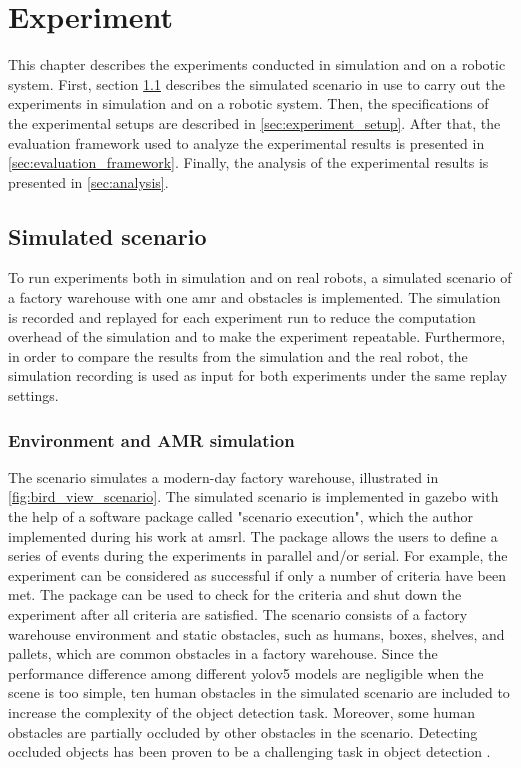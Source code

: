 \chapter{Experiment}\label{ch:experiment}

This chapter describes the experiments conducted in simulation and on a robotic system. First, section \cref{sec:simulated_scenario} describes the simulated scenario in use to carry out the experiments in simulation and on a robotic system. Then, the specifications of the experimental setups are described in \cref{sec:experiment_setup}. After that, the evaluation framework used to analyze the experimental results is presented in \cref{sec:evaluation_framework}. Finally, the analysis of the experimental results is presented in \cref{sec:analysis}.

\section{Simulated scenario}\label{sec:simulated_scenario}

To run experiments both in simulation and on real robots, a simulated scenario of a factory warehouse with one \gls{amr} and obstacles is implemented. The simulation is recorded and replayed for each experiment run to reduce the computation overhead of the simulation and to make the experiment repeatable. Furthermore, in order to compare the results from the simulation and the real robot, the simulation recording is used as input for both experiments under the same replay settings. 

\subsection{Environment and AMR simulation}

The scenario simulates a modern-day factory warehouse, illustrated in \cref{fig:bird_view_scenario}. The simulated scenario is implemented in \gls{gazebo} with the help of a software package called "scenario execution", which the author implemented during his work at \gls{amsrl}. The package allows the users to define a series of events during the experiments in parallel and/or serial. For example, the experiment can be considered as successful if only a number of criteria have been met. The package can be used to check for the criteria and shut down the experiment after all criteria are satisfied. The scenario consists of a factory warehouse environment and static obstacles, such as humans, boxes, shelves, and pallets, which are common obstacles in a factory warehouse. Since the performance difference among different \gls{yolo}v5 models are negligible when the scene is too simple, ten human obstacles in the simulated scenario are included to increase the complexity of the object detection task. Moreover, some human obstacles are partially occluded by other obstacles in the scenario. Detecting occluded objects has been proven to be a challenging task in object detection \cite{Saleh2021}. 

